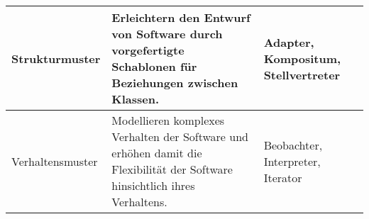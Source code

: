 \documentclass{lehramt-informatik-aufgabe}
\begin{document}
\begin{enumerate}
\begin{antwort}
\begin{tabularx}{\linewidth}{p{2cm}|X|p{2cm}}
Strukturmuster &
Erleichtern den Entwurf von Software durch vorgefertigte Schablonen für
Beziehungen zwischen Klassen. &
Adapter, Kompositum, Stellvertreter \\\hline

Verhaltensmuster  &
Modellieren komplexes Verhalten der Software und erhöhen damit die
Flexibilität der Software hinsichtlich ihres Verhaltens. &
Beobachter, Interpreter, Iterator \\
\end{tabularx}
\end{antwort}
\end{enumerate}
\end{document}
